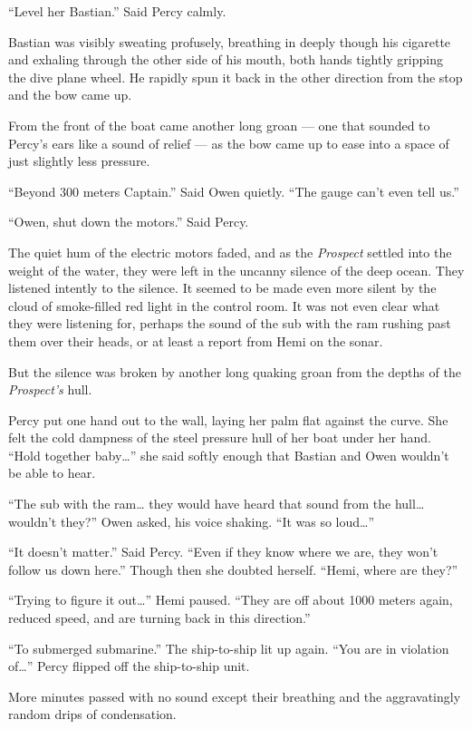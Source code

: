 \documentclass[]{scrbook}
\begin{document}
``Level her Bastian.'' Said Percy calmly.

Bastian was visibly sweating profusely, breathing in deeply though his
cigarette and exhaling through the other side of his mouth, both hands
tightly gripping the dive plane wheel. He rapidly spun it back in the
other direction from the stop and the bow came up.

From the front of the boat came another long groan --- one that sounded
to Percy's ears like a sound of relief --- as the bow came up to ease
into a space of just slightly less pressure.

``Beyond 300 meters Captain.'' Said Owen quietly. ``The gauge can't even
tell us.''

``Owen, shut down the motors.'' Said Percy.

The quiet hum of the electric motors faded, and as the \emph{Prospect}
settled into the weight of the water, they were left in the uncanny
silence of the deep ocean. They listened intently to the silence. It
seemed to be made even more silent by the cloud of smoke-filled red
light in the control room. It was not even clear what they were
listening for, perhaps the sound of the sub with the ram rushing past
them over their heads, or at least a report from Hemi on the sonar.

But the silence was broken by another long quaking groan from the depths
of the \emph{Prospect's} hull.

Percy put one hand out to the wall, laying her palm flat against the
curve. She felt the cold dampness of the steel pressure hull of her boat
under her hand. ``Hold together baby\ldots{}'' she said softly enough
that Bastian and Owen wouldn't be able to hear.

``The sub with the ram\ldots{} they would have heard that sound from the
hull\ldots{} wouldn't they?'' Owen asked, his voice shaking. ``It was so
loud\ldots{}''

``It doesn't matter.'' Said Percy. ``Even if they know where we are,
they won't follow us down here.'' Though then she doubted herself.
``Hemi, where are they?''

``Trying to figure it out\ldots{}'' Hemi paused. ``They are off about
1000 meters again, reduced speed, and are turning back in this
direction.''

``To submerged submarine.'' The ship-to-ship lit up again. ``You are in
violation of\ldots{}'' Percy flipped off the ship-to-ship unit.

More minutes passed with no sound except their breathing and the
aggravatingly random drips of condensation.
\end{document}
